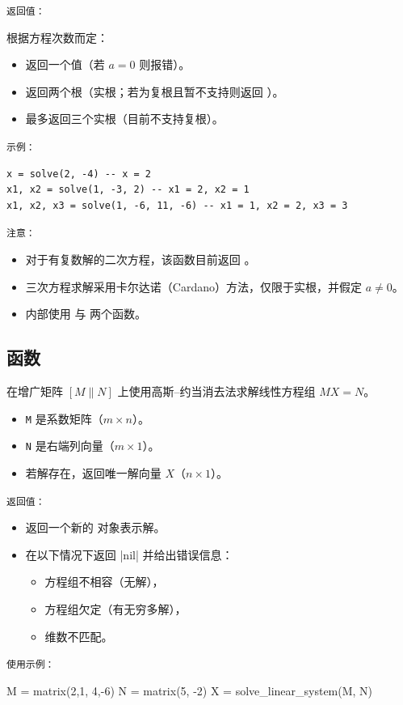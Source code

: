 \medskip
\texttt{返回值：}

根据方程次数而定：
\begin{itemize}
\item {} 返回一个值（若 $a = 0$ 则报错）。
\item {} 返回两个根（实根；若为复根且暂不支持则返回 ）。
\item {} 最多返回三个实根（目前不支持复根）。
\end{itemize}

\medskip
\texttt{示例：}

\begin{verbatim}
x = solve(2, -4) -- x = 2
x1, x2 = solve(1, -3, 2) -- x1 = 2, x2 = 1
x1, x2, x3 = solve(1, -6, 11, -6) -- x1 = 1, x2 = 2, x3 = 3
\end{verbatim}

\medskip
\texttt{注意：}

\begin{itemize}
\item 对于有复数解的二次方程，该函数目前返回 。
\item 三次方程求解采用卡尔达诺（Cardano）方法，仅限于实根，并假定 $a \ne 0$。
\item 内部使用  与  两个函数。
\end{itemize}

\subsection{函数 }
在增广矩阵 $[M\|N]$ 上使用高斯–约当消去法求解线性方程组 $MX = N$。

\begin{itemize}
\item \texttt{M} 是系数矩阵（$m \times n$）。
\item \texttt{N} 是右端列向量（$m \times 1$）。
\item 若解存在，返回唯一解向量 $X$（$n \times 1$）。
\end{itemize}

\medskip
\texttt{返回值：}

\begin{itemize}
\item 返回一个新的  对象表示解。
\item 在以下情况下返回 |nil| 并给出错误信息：
\begin{itemize}
\item 方程组不相容（无解），
\item 方程组欠定（有无穷多解），
\item 维数不匹配。
\end{itemize}
\end{itemize}

\texttt{使用示例：}

\begin{tkzexample}
M = matrix({{2,1}, {4,-6}})
N = matrix({{5}, {-2}})
X = solve_linear_system(M, N)
\end{tkzexample}
\endinput
